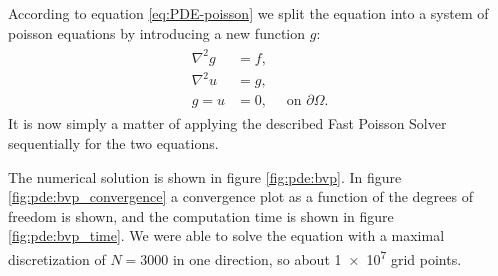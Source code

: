 According to equation \eqref{eq:PDE-poisson} we split the equation into a system of poisson equations by introducing a new function $g$:
\begin{align*}
  \begin{split}
    \nabla^2g &= f,\\
    \nabla^2u &= g,\\
    g = u &= 0,\quad \text{ on } \partial \Omega.
  \end{split}
\end{align*}
It is now simply a matter of applying the described Fast Poisson Solver sequentially for the two equations.

The numerical solution is shown in figure \ref{fig:pde:bvp}.
In figure \ref{fig:pde:bvp_convergence} a convergence plot as a function of the degrees of freedom is shown, and the computation time is shown in figure \ref{fig:pde:bvp_time}.
We were able to solve the equation with a maximal discretization of $N = 3000$ in one direction, so about \num{1e7} grid points.



\iffalse
\begin{figure}[tb]
  \centering
  \begin{tikzpicture}
    \pgfplotsset{colormap={redblue}{rgb=(0,0,1) rgb=(1,1,1) rgb=(1,0,0)}}
    \begin{axis}[
	      width=8.2cm, height=7.5cm,
	      xlabel=$x$, xtick distance=0.25,
	      ylabel=$y$, ytick distance=0.25,
        zlabel={$u(x, y)$},
        mesh/ordering=x varies,
        mesh/cols=256,
        mesh/rows=256,
	      view={20}{50},
      ]
	    \addplot3 [
		    surf,
        point meta=explicit,
	    ] table[meta=U]{./PDE/biharmonic_solution_256.dat};
    \end{axis}
  \end{tikzpicture}
  \caption{The solution $u(x, y)$ to the Biharmonic equation. TODO:write more}
  \label{fig:pde:bvp}
\end{figure}
\fi

